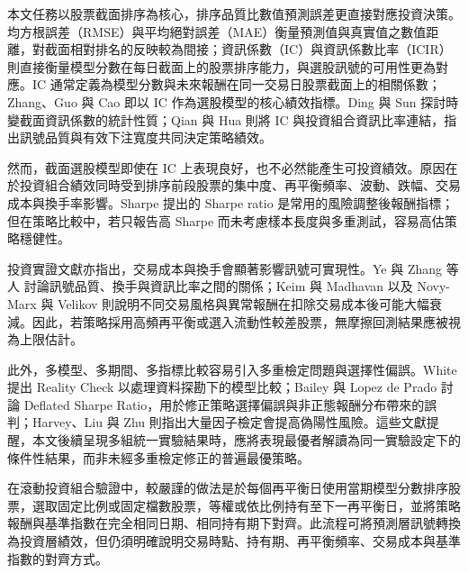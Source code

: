 本文任務以股票截面排序為核心，排序品質比數值預測誤差更直接對應投資決策。均方根誤差（RMSE）與平均絕對誤差（MAE）衡量預測值與真實值之數值距離，對截面相對排名的反映較為間接；資訊係數（IC）與資訊係數比率（ICIR）則直接衡量模型分數在每日截面上的股票排序能力，與選股訊號的可用性更為對應。IC 通常定義為模型分數與未來報酬在同一交易日股票截面上的相關係數；Zhang、Guo 與 Cao \cite{zhang2020information_coefficient} 即以 IC 作為選股模型的核心績效指標。Ding 與 Sun \cite{ding2022timevarying_ic} 探討時變截面資訊係數的統計性質；Qian 與 Hua \cite{qian2004active_risk} 則將 IC 與投資組合資訊比率連結，指出訊號品質與有效下注寬度共同決定策略績效。

然而，截面選股模型即使在 IC 上表現良好，也不必然能產生可投資績效。原因在於投資組合績效同時受到排序前段股票的集中度、再平衡頻率、波動、跌幅、交易成本與換手率影響。Sharpe \cite{sharpe1994ratio} 提出的 Sharpe ratio 是常用的風險調整後報酬指標；但在策略比較中，若只報告高 Sharpe 而未考慮樣本長度與多重測試，容易高估策略穩健性。

投資實證文獻亦指出，交易成本與換手會顯著影響訊號可實現性。Ye \cite{ye2008signal_quality} 與 Zhang 等人 \cite{zhang2021turnover_ir} 討論訊號品質、換手與資訊比率之間的關係；Keim 與 Madhavan \cite{keim1997transaction_costs} 以及 Novy-Marx 與 Velikov \cite{novy_marx2016taxonomy} 則說明不同交易風格與異常報酬在扣除交易成本後可能大幅衰減。因此，若策略採用高頻再平衡或選入流動性較差股票，無摩擦回測結果應被視為上限估計。

此外，多模型、多期間、多指標比較容易引入多重檢定問題與選擇性偏誤。White \cite{white2000reality_check} 提出 Reality Check 以處理資料探勘下的模型比較；Bailey 與 Lopez de Prado \cite{bailey2014deflated_sharpe} 討論 Deflated Sharpe Ratio，用於修正策略選擇偏誤與非正態報酬分布帶來的誤判；Harvey、Liu 與 Zhu \cite{harvey2016cross_section} 則指出大量因子檢定會提高偽陽性風險。這些文獻提醒，本文後續呈現多組統一實驗結果時，應將表現最優者解讀為同一實驗設定下的條件性結果，而非未經多重檢定修正的普遍最優策略。

在滾動投資組合驗證中，較嚴謹的做法是於每個再平衡日使用當期模型分數排序股票，選取固定比例或固定檔數股票，等權或依比例持有至下一再平衡日，並將策略報酬與基準指數在完全相同日期、相同持有期下對齊。此流程可將預測層訊號轉換為投資層績效，但仍須明確說明交易時點、持有期、再平衡頻率、交易成本與基準指數的對齊方式。

